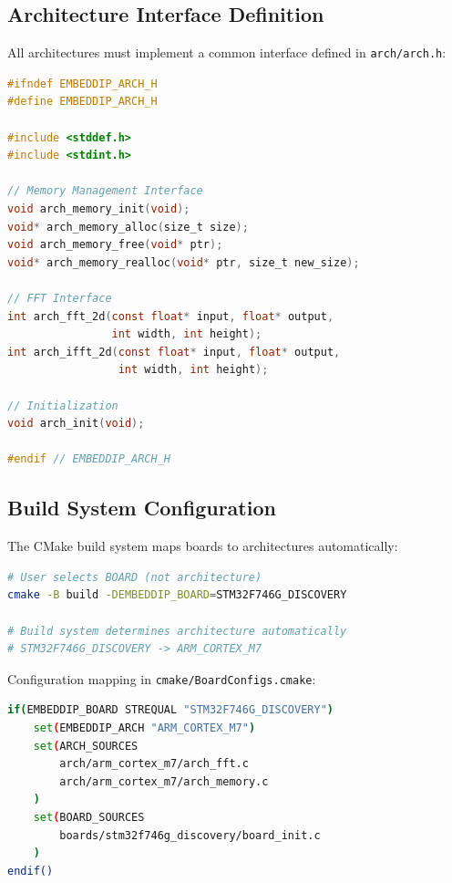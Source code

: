\documentclass[11pt,a4paper]{article}
\begin{document}
\subsection{Architecture Interface Definition}

All architectures must implement a common interface defined in \texttt{arch/arch.h}:

\begin{lstlisting}[language=C,caption={Common architecture interface}]
#ifndef EMBEDDIP_ARCH_H
#define EMBEDDIP_ARCH_H

#include <stddef.h>
#include <stdint.h>

// Memory Management Interface
void arch_memory_init(void);
void* arch_memory_alloc(size_t size);
void arch_memory_free(void* ptr);
void* arch_memory_realloc(void* ptr, size_t new_size);

// FFT Interface
int arch_fft_2d(const float* input, float* output,
                int width, int height);
int arch_ifft_2d(const float* input, float* output,
                 int width, int height);

// Initialization
void arch_init(void);

#endif // EMBEDDIP_ARCH_H
\end{lstlisting}

\subsection{Build System Configuration}

The CMake build system maps boards to architectures automatically:

\begin{lstlisting}[language=bash,caption={CMake board selection}]
# User selects BOARD (not architecture)
cmake -B build -DEMBEDDIP_BOARD=STM32F746G_DISCOVERY

# Build system determines architecture automatically
# STM32F746G_DISCOVERY -> ARM_CORTEX_M7
\end{lstlisting}

Configuration mapping in \texttt{cmake/BoardConfigs.cmake}:

\begin{lstlisting}[language=bash,caption={Board to architecture mapping}]
if(EMBEDDIP_BOARD STREQUAL "STM32F746G_DISCOVERY")
    set(EMBEDDIP_ARCH "ARM_CORTEX_M7")
    set(ARCH_SOURCES
        arch/arm_cortex_m7/arch_fft.c
        arch/arm_cortex_m7/arch_memory.c
    )
    set(BOARD_SOURCES
        boards/stm32f746g_discovery/board_init.c
    )
endif()
\end{lstlisting}
\end{document}
